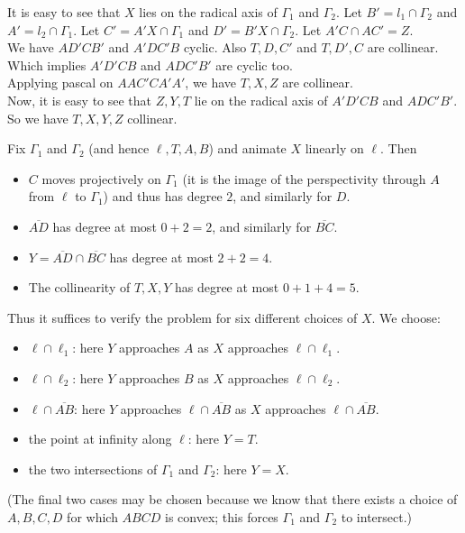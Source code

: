 	\begin{solution}
		It is easy to see that $ X $ lies on the radical axis of $ \Gamma_1 $ and $ \Gamma_2 $. Let $ B' = l_1\cap \Gamma_2 $ and $ A' = l_2\cap \Gamma_1 $. Let $ C'=A'X\cap \Gamma_1 $ and $ D'=B'X\cap \Gamma_2 $. Let $ A'C\cap AC'=Z $.\\
		
		We have $ AD'CB' $ and $ A'DC'B $ cyclic. Also $ T, D, C' $ and $ T, D', C $ are collinear. Which implies $ A'D'CB $ and $ ADC'B' $ are cyclic too.\\
		
		Applying pascal on $ AAC'CA'A' $, we have $ T, X, Z $ are collinear.\\ 
		
		Now, it is easy to see that $ Z, Y, T $ lie on the radical axis of $ A'D'CB $ and $ ADC'B' $. So we have $ T, X, Y, Z $ collinear.
		
	\end{solution}

	\begin{solution}
		Fix $\Gamma_1$ and $\Gamma_2$ (and hence $\ell, T, A, B$) and animate $X$ linearly on $\ell$. Then
		
		\begin{itemize}
			\item $C$ moves projectively on $\Gamma_1$ (it is the image of the perspectivity through $A$ from $\ell$ to $\Gamma_1$) and thus has degree $2$, and similarly for $D$.
			\item $\overline{AD}$ has degree at most $0+2=2$, and similarly for $\overline{BC}$.
			\item $Y=\overline{AD}\cap\overline{BC}$ has degree at most $2+2=4.$
			\item The collinearity of $T,X,Y$ has degree at most $0+1+4=5.$
		\end{itemize}
		
		Thus it suffices to verify the problem for six different choices of $X$. We choose:
		
		\begin{itemize}
			\item $\ell\cap \ell_1$: here $Y$ approaches $A$ as $X$ approaches $\ell\cap \ell_1$.
			\item $\ell\cap\ell_2$: here $Y$ approaches $B$ as $X$ approaches $\ell\cap \ell_2$.
			\item $\ell\cap \overline{AB}$: here $Y$ approaches $\ell\cap \overline{AB}$ as $X$ approaches $\ell\cap \overline{AB}$.
			\item the point at infinity along $\ell$: here $Y=T$.
			\item the two intersections of $\Gamma_1$ and $\Gamma_2$: here $Y=X$.
		\end{itemize}
		
		(The final two cases may be chosen because we know that there exists a choice of $A,B,C,D$ for which $ABCD$ is convex; this forces $\Gamma_1$ and $\Gamma_2$ to intersect.)
	\end{solution}

